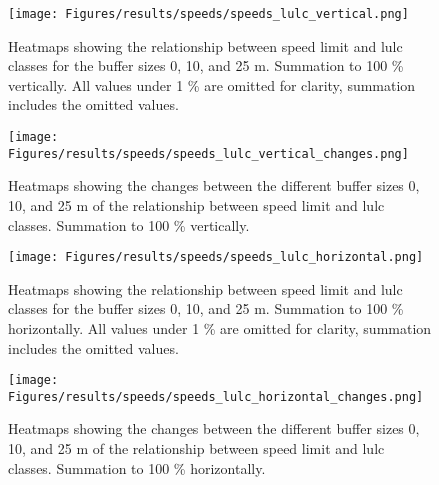 \begin{figure}[!htb]
    \centering
    \texttt{[image: Figures/results/speeds/speeds\_lulc\_vertical.png]}
    \caption[Heatmaps of Speed Limit Classes vs.  Classes, Vertical Summation]{Heatmaps showing the relationship between speed limit and \gls{lulc} classes for the buffer sizes 0, 10, and 25 m. Summation to 100 \% vertically. All values under 1 \% are omitted for clarity, summation includes the omitted values.}
    \label{app_fig:speeds_v}
\end{figure}

\begin{figure}[!htb]
    \centering
    \texttt{[image: Figures/results/speeds/speeds\_lulc\_vertical\_changes.png]}
    \caption[Heatmaps of Speed Limit Classes vs.  Classes, Changes, Vertical Summation]{Heatmaps showing the changes between the different buffer sizes 0, 10, and 25 m of the relationship between speed limit and \gls{lulc} classes. Summation to 100 \% vertically.}
    \label{app_fig:speeds_v_changes}
\end{figure}

\clearpage

\begin{figure}[!htb]
    \centering
    \texttt{[image: Figures/results/speeds/speeds\_lulc\_horizontal.png]}
    \caption[Heatmaps of Speed Limit Classes vs.  Classes, Horizontal Summation]{Heatmaps showing the relationship between speed limit and \gls{lulc} classes for the buffer sizes 0, 10, and 25 m. Summation to 100 \% horizontally. All values under 1 \% are omitted for clarity, summation includes the omitted values.}
    \label{app_fig:speeds_h}
\end{figure}

\begin{figure}[!htb]
    \centering
    \texttt{[image: Figures/results/speeds/speeds\_lulc\_horizontal\_changes.png]}
    \caption[Heatmaps of Speed Limit Classes vs.  Classes, Changes, Horizontal Summation]{Heatmaps showing the changes between the different buffer sizes 0, 10, and 25 m of the relationship between speed limit and \gls{lulc} classes. Summation to 100 \% horizontally.}
    \label{app_fig:speeds_h_changes}
\end{figure}

\clearpage

